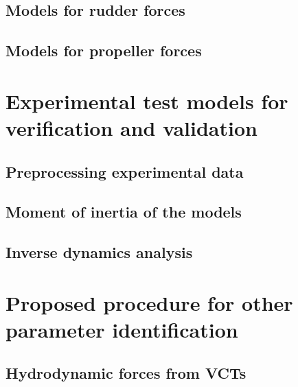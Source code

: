 \documentclass[preprint,11pt,authoryear]{elsarticle}
\begin{document}
\subsection{Models for rudder forces}

\subsection{Models for propeller forces}

\FloatBarrier


\section{Experimental test models for verification and validation}
\label{sec:test_cases}

\FloatBarrier
\subsection{Preprocessing experimental data}

\FloatBarrier
\subsection{Moment of inertia of the models}

\subsection{Inverse dynamics analysis}


\section{Proposed procedure for other parameter identification} \label{sec:PIT}

%

\subsection{Hydrodynamic forces from VCTs}
\label{sec:methodology_VCT}

\FloatBarrier
% 
\end{document}
